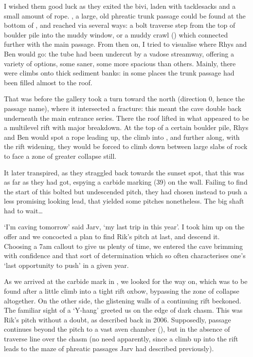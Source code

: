 I wished them good luck as they exited the bivi, laden with tacklesacks and a small amount of rope. , a large, old phreatic trunk passage could be found at the bottom of , and reached via several ways: a bolt traverse step from the top of boulder pile into the muddy window, or a muddy crawl () which connected further with the main passage. From then on, I tried to visualise where Rhys and Ben would go: the tube had been undercut by a vadose streamway, offering a variety of options, some saner, some more spacious than others. Mainly, there were climbs onto thick sediment banks: in some places the trunk passage had been filled almost to the roof. 

That was before the gallery took a turn toward the north (direction 0, hence the passage name), where it intersected a fracture: this meant the cave double back underneath the main  entrance series. There the roof lifted in what appeared to be a multilevel rift with major breakdown. At the top of a certain boulder pile, Rhys and Ben would spot a rope leading up, the climb into , and further along, with the rift widening, they would be forced to climb down between large slabs of rock to face a zone of greater collapse still. 

It later transpired, as they straggled back towards the sunset spot, that this was as far as they had got,  espying a carbide marking (39) on the wall. Failing to find the start of this bolted but undescended pitch, they had chosen instead to push a less promising looking lead, that yielded some pitches nonetheless. The big shaft had to wait…

`I'm caving tomorrow' said Jarv, `my last trip in  this year'. I took him up on the offer and we concocted a plan to find Rik's pitch at last, and descend it. Choosing a 7am callout to give us plenty of time, we entered the cave brimming with confidence and that sort of determination which so often characterises one's `last opportunity to push' in a given year. 

As we arrived at the carbide mark in , we looked for the way on, which was to be found after a little climb into a tight rift oxbow, bypassing the zone of collapse altogether. On the other side, the glistening walls of a continuing rift beckoned. The familiar sight of a `Y-hang' greeted us on the edge of dark chasm. This was Rik's pitch without a doubt, as described back in 2006. Supposedly,  passage continues beyond the pitch to a vast aven chamber (), but in the absence of traverse line over the chasm (no need apparently, since a climb up into the rift leads to the maze of phreatic passages Jarv had described previously).


